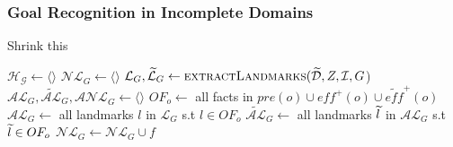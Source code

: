 \documentclass{beamer}
\newcommand{\todo}[1]{ {\color{red} #1} }
\begin{document}
\begin{frame}[c]\frametitle{Goal Recognition in Incomplete Domains}
	\todo{Shrink this}
	    \label{alg:RecognizeIncompleteDomains}
	    \begin{algorithmic}[1]
			{\footnotesize
			\State $\mathcal{H}_{\mathcal{G}} \gets \langle \rangle$ 
				\State $\mathcal{NL}_{G} \gets \langle \rangle$ 
				\State $\mathcal{L}_{G}, \mathcal{\widetilde{L}}_{G} \gets \textsc{extractLandmarks}(\widetilde{\mathcal{D}}, Z, \mathcal{I}, G$) \label{alg:RecognizeIncompleteDomains:ExtractLandmarks}
				\State $\mathcal{AL}_{G}, \mathcal{\widetilde{AL}}_{G}, \mathcal{ANL}_{G} \gets \langle \rangle$ 
					\State $OF_{o} \gets$ all facts in $\mathit{pre}(o) \cup \mathit{eff}^{+}(o) \cup \widetilde{\mathit{eff}}^{+}(o)$ \label{alg:RecognizeIncompleteDomains:UpdateState}
					\State $\mathcal{AL}_{G} \gets $ all landmarks $l$ in $\mathcal{L}_{G}$ s.t $l \in OF_{o}$ \label{alg:RecognizeIncompleteDomains:AchievedDefiniteLandmarks}
					\State $\mathcal{\widetilde{AL}}_{G} \gets $ all landmarks $\widetilde{l}$ in $\mathcal{AL}_{G}$ s.t $\widetilde{l} \in OF_{o}$ \label{alg:RecognizeIncompleteDomains:AchievedPossibleLandmarks}
						 \label{alg:RecognizeIncompleteDomains:OverlookedLandmarks}
							\State $\mathcal{NL}_{G} \gets \mathcal{NL}_{G} \cup f$ \label{alg:RecognizeIncompleteDomains:OverlookedLandmarksStore}
}
\end{algorithmic}
\end{frame}
\end{document}
